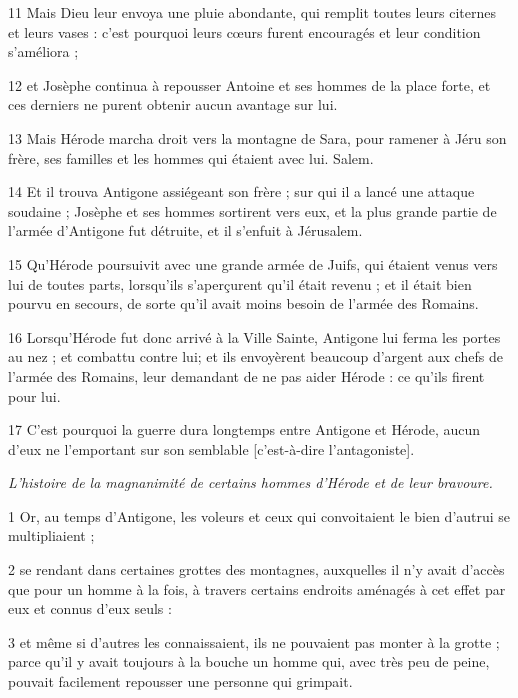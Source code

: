 \par 11 Mais Dieu leur envoya une pluie abondante, qui remplit toutes leurs citernes et leurs vases : c'est pourquoi leurs cœurs furent encouragés et leur condition s'améliora ;

\par 12 et Josèphe continua à repousser Antoine et ses hommes de la place forte, et ces derniers ne purent obtenir aucun avantage sur lui.

\par 13 Mais Hérode marcha droit vers la montagne de Sara, pour ramener à Jéru son frère, ses familles et les hommes qui étaient avec lui. Salem.

\par 14 Et il trouva Antigone assiégeant son frère ; sur qui il a lancé une attaque soudaine ; Josèphe et ses hommes sortirent vers eux, et la plus grande partie de l'armée d'Antigone fut détruite, et il s'enfuit à Jérusalem.

\par 15 Qu'Hérode poursuivit avec une grande armée de Juifs, qui étaient venus vers lui de toutes parts, lorsqu'ils s'aperçurent qu'il était revenu ; et il était bien pourvu en secours, de sorte qu'il avait moins besoin de l'armée des Romains.

\par 16 Lorsqu'Hérode fut donc arrivé à la Ville Sainte, Antigone lui ferma les portes au nez ; et combattu contre lui; et ils envoyèrent beaucoup d'argent aux chefs de l'armée des Romains, leur demandant de ne pas aider Hérode : ce qu'ils firent pour lui.

\par 17 C'est pourquoi la guerre dura longtemps entre Antigone et Hérode, aucun d'eux ne l'emportant sur son semblable [c'est-à-dire l'antagoniste].


\par \textit{L'histoire de la magnanimité de certains hommes d'Hérode et de leur bravoure.}

\par 1 Or, au temps d'Antigone, les voleurs et ceux qui convoitaient le bien d'autrui se multipliaient ;

\par 2 se rendant dans certaines grottes des montagnes, auxquelles il n'y avait d'accès que pour un homme à la fois, à travers certains endroits aménagés à cet effet par eux et connus d'eux seuls :

\par 3 et même si d'autres les connaissaient, ils ne pouvaient pas monter à la grotte ; parce qu'il y avait toujours à la bouche un homme qui, avec très peu de peine, pouvait facilement repousser une personne qui grimpait.

